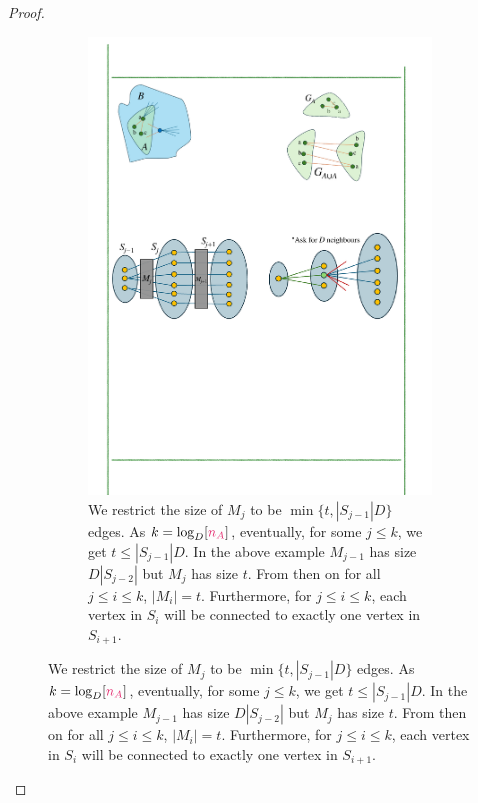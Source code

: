 \documentclass[11pt]{article}
\newcommand{\na}{\textcolor{razzmatazz}{n_A}}
\begin{document}
\begin{proof}
\begin{figure}[t!]
\begin{subfigure}[t]{0.95\textwidth}
        \label{subfig:embeddingA}
    \end{subfigure}%
    \hspace{1mm}
    \hspace{1mm}
    \begin{subfigure}[t]{0.95\textwidth}
        \centering
        \includegraphics[]{assets/embeddingB.pdf}
        \caption{We restrict the size of $M_j$ to be $\min\{t, |S_{j-1}|D\}$ edges. As $k = \log_{D}[\na]$, eventually, for some $j \leq k$, we get $t \leq |S_{j-1}|D$.
        In the above example $M_{j-1}$ has size $D|S_{j-2}|$ but $M_j$ has size $t$. 
        From then on for all $j \leq i \leq k$, $|M_i|= t$.
        Furthermore, for $j \leq i \leq k$,  each vertex in $S_i$ will be connected to exactly one vertex in $S_{i+1}$.
        }
        \label{subfig:embeddingB}        
    \end{subfigure}
\end{figure}



\end{proof}
\end{document}
